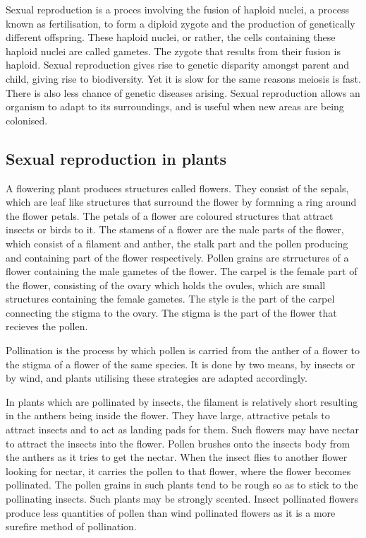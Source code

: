 Sexual reproduction is a proces involving the fusion of haploid nuclei, a process known as 
fertilisation, to form a diploid zygote and the production of genetically different offspring. 
These haploid nuclei, or rather, the cells containing these haploid nuclei are called gametes. The
zygote that results from their fusion is haploid. Sexual reproduction gives rise to genetic
disparity amongst parent and child, giving rise to biodiversity. Yet it is slow for the same
reasons meiosis is fast. There is also less chance of genetic diseases arising. Sexual reproduction
allows an organism to adapt to its surroundings, and is useful when new areas are being colonised.

\subsection{Sexual reproduction in plants}

A flowering plant produces structures called flowers. They consist of the sepals, which are leaf
like structures that surround the flower by formning a ring around the flower petals. The
petals of a flower are coloured structures that attract insects or birds to it. The stamens of a
flower are the male parts of the flower, which consist of a filament and anther, the stalk part
and the pollen producing and containing part of the flower respectively. Pollen grains are 
strructures of a flower containing the male gametes of the flower. The carpel is the female part
of the flower, consisting of the ovary which holds the ovules, which are small structures 
containing the female gametes. The style is the part of the carpel connecting the stigma to the
ovary. The stigma is the part of the flower that recieves the pollen.

Pollination is the process by which pollen is carried from the anther of a flower to the stigma
of a flower of the same species. It is done by two means, by insects or by wind, and plants 
utilising these strategies are adapted accordingly.

In plants which are pollinated by insects, the filament is relatively short resulting in the
anthers being inside the flower. They have large, attractive petals to attract insects and to act
as landing pads for them. Such flowers may have nectar to attract the insects into the flower. 
Pollen brushes onto the insects body from the anthers as it tries to get the nectar. When the
insect flies to another flower looking for nectar, it carries the pollen to that flower, where
the flower becomes pollinated. The pollen grains in such plants tend to be rough so as to stick
to the pollinating insects. Such plants may be strongly scented. Insect pollinated flowers produce
less quantities of pollen than wind pollinated flowers as it is a more surefire method of 
pollination.


